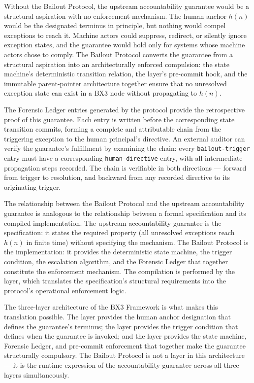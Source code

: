 Without the Bailout Protocol, the upstream accountability guarantee would be a
structural aspiration with no enforcement mechanism.  The human anchor
$h(n)$ would be the designated terminus in principle, but nothing would compel
exceptions to reach it.  Machine actors could suppress, redirect, or silently
ignore exception states, and the guarantee would hold only for systems whose
machine actors chose to comply.  The Bailout Protocol converts the guarantee
from a structural aspiration into an architecturally enforced compulsion: the
state machine's deterministic transition relation, the \fact{} layer's
pre-commit hook, and the immutable parent-pointer architecture together ensure
that no unresolved exception state can exist in a BX3 node without propagating
to $h(n)$.

The Forensic Ledger entries generated by the protocol provide the
retrospective proof of this guarantee.  Each entry is written before the
corresponding state transition commits, forming a complete and attributable
chain from the triggering exception to the human principal's directive.
An external auditor can verify the guarantee's fulfillment by examining the
chain: every \texttt{bailout-trigger} entry must have a corresponding
\texttt{human-directive} entry, with all intermediate propagation steps
recorded.  The chain is verifiable in both directions --- forward from
trigger to resolution, and backward from any recorded directive to its
originating trigger.

The relationship between the Bailout Protocol and the upstream accountability
guarantee is analogous to the relationship between a formal specification
and its compiled implementation.  The upstream accountability guarantee is
the specification: it states the required property (all unresolved
exceptions reach $h(n)$ in finite time) without specifying the mechanism.
The Bailout Protocol is the implementation: it provides the deterministic
state machine, the trigger condition, the escalation algorithm, and the
Forensic Ledger that together constitute the enforcement mechanism.  The
compilation is performed by the \fact{} layer, which translates the
specification's structural requirements into the protocol's operational
enforcement logic.

The three-layer architecture of the BX3 Framework is what makes this
translation possible.  The \purpose{} layer provides the human anchor
designation that defines the guarantee's terminus; the \bounds{} layer
provides the trigger condition that defines when the guarantee is invoked;
and the \fact{} layer provides the state machine, Forensic Ledger, and
pre-commit enforcement that together make the guarantee structurally
compulsory.  The Bailout Protocol is not a layer in this architecture ---
it is the runtime expression of the accountability guarantee across all
three layers simultaneously.